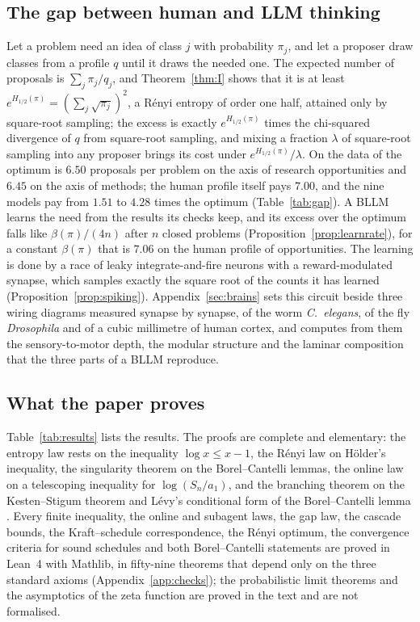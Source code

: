 \subsection{The gap between human and LLM thinking}

Let a problem need an idea of class $j$ with probability $\pi_{j}$, and let a proposer draw classes from a profile $q$ until it draws the needed one. The expected number of proposals is $\sum_{j}\pi_{j}/q_{j}$, and Theorem~\ref{thm:I} shows that it is at least $e^{H_{1/2}(\pi)}=(\sum_{j}\sqrt{\pi_{j}})^{2}$, a R\'enyi entropy of order one half, attained only by square-root sampling; the excess is exactly $e^{H_{1/2}(\pi)}$ times the chi-squared divergence of $q$ from square-root sampling, and mixing a fraction $\lambda$ of square-root sampling into any proposer brings its cost under $e^{H_{1/2}(\pi)}/\lambda$. On the data of \cite{CZC26} the optimum is $6.50$ proposals per problem on the axis of research opportunities and $6.45$ on the axis of methods; the human profile itself pays $7.00$, and the nine models pay from $1.51$ to $4.28$ times the optimum (Table~\ref{tab:gap}). A BLLM learns the need from the results its checks keep, and its excess over the optimum falls like $\beta(\pi)/(4n)$ after $n$ closed problems (Proposition~\ref{prop:learnrate}), for a constant $\beta(\pi)$ that is $7.06$ on the human profile of opportunities. The learning is done by a race of leaky integrate-and-fire neurons with a reward-modulated synapse, which samples exactly the square root of the counts it has learned (Proposition~\ref{prop:spiking}). Appendix~\ref{sec:brains} sets this circuit beside three wiring diagrams measured synapse by synapse, of the worm \textit{C.~elegans}, of the fly \textit{Drosophila} and of a cubic millimetre of human cortex, and computes from them the sensory-to-motor depth, the modular structure and the laminar composition that the three parts of a BLLM reproduce.

\subsection{What the paper proves}

Table~\ref{tab:results} lists the results. The proofs are complete and elementary: the entropy law rests on the inequality $\log x\le x-1$, the R\'enyi law on H\"older's inequality, the singularity theorem on the Borel--Cantelli lemmas, the online law on a telescoping inequality for $\log(S_{n}/a_{1})$, and the branching theorem on the Kesten--Stigum theorem \cite{KS66} and L\'evy's conditional form of the Borel--Cantelli lemma \cite{Dur19}. Every finite inequality, the online and subagent laws, the gap law, the cascade bounds, the Kraft--schedule correspondence, the R\'enyi optimum, the convergence criteria for sound schedules and both Borel--Cantelli statements are proved in Lean~4 with Mathlib, in fifty-nine theorems that depend only on the three standard axioms (Appendix~\ref{app:checks}); the probabilistic limit theorems and the asymptotics of the zeta function are proved in the text and are not formalised.

